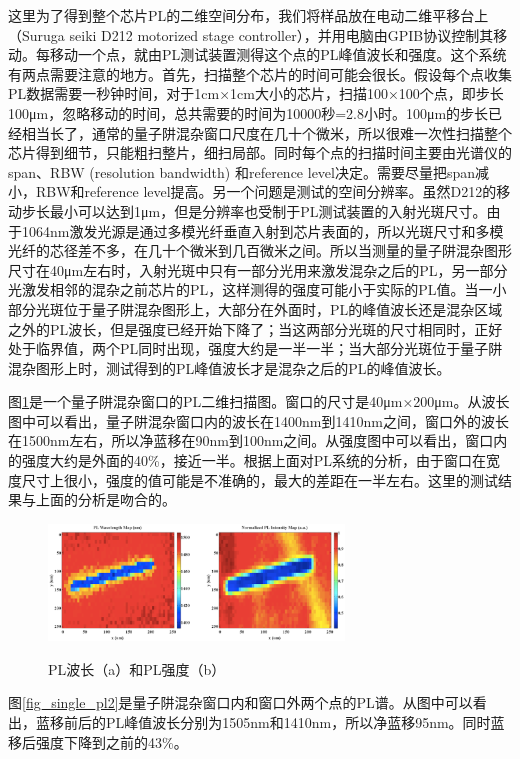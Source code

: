 \documentclass{ZJUthesis}
\begin{document}
这里为了得到整个芯片PL的二维空间分布，我们将样品放在电动二维平移台上（Suruga seiki D212 motorized stage controller），并用电脑由GPIB协议控制其移动。每移动一个点，就由PL测试装置测得这个点的PL峰值波长和强度。这个系统有两点需要注意的地方。首先，扫描整个芯片的时间可能会很长。假设每个点收集PL数据需要一秒钟时间，对于1cm×1cm大小的芯片，扫描100×100个点，即步长100μm，忽略移动的时间，总共需要的时间为10000秒=2.8小时。100μm的步长已经相当长了，通常的量子阱混杂窗口尺度在几十个微米，所以很难一次性扫描整个芯片得到细节，只能粗扫整片，细扫局部。同时每个点的扫描时间主要由光谱仪的span、RBW (resolution bandwidth) 和reference level决定。需要尽量把span减小，RBW和reference level提高。另一个问题是测试的空间分辨率。虽然D212的移动步长最小可以达到1μm，但是分辨率也受制于PL测试装置的入射光斑尺寸。由于1064nm激发光源是通过多模光纤垂直入射到芯片表面的，所以光斑尺寸和多模光纤的芯径差不多，在几十个微米到几百微米之间。所以当测量的量子阱混杂图形尺寸在40μm左右时，入射光斑中只有一部分光用来激发混杂之后的PL，另一部分光激发相邻的混杂之前芯片的PL，这样测得的强度可能小于实际的PL值。当一小部分光斑位于量子阱混杂图形上，大部分在外面时，PL的峰值波长还是混杂区域之外的PL波长，但是强度已经开始下降了；当这两部分光斑的尺寸相同时，正好处于临界值，两个PL同时出现，强度大约是一半一半；当大部分光斑位于量子阱混杂图形上时，测试得到的PL峰值波长才是混杂之后的PL的峰值波长。

图\ref{fig_single_pl}是一个量子阱混杂窗口的PL二维扫描图。窗口的尺寸是40μm×200μm。从波长图中可以看出，量子阱混杂窗口内的波长在1400nm到1410nm之间，窗口外的波长在1500nm左右，所以净蓝移在90nm到100nm之间。从强度图中可以看出，窗口内的强度大约是外面的40\%，接近一半。根据上面对PL系统的分析，由于窗口在宽度尺寸上很小，强度的值可能是不准确的，最大的差距在一半左右。这里的测试结果与上面的分析是吻合的。

\begin{figure}[!ht]
  \centering
  \includegraphics[width=0.7\textwidth]{./Pictures/single_pl.eps}\\
  \caption{PL波长（a）和PL强度（b）}
  \label{fig_single_pl}
\end{figure}

图\ref{fig_single_pl2}是量子阱混杂窗口内和窗口外两个点的PL谱。从图中可以看出，蓝移前后的PL峰值波长分别为1505nm和1410nm，所以净蓝移95nm。同时蓝移后强度下降到之前的43\%。
\end{document}
